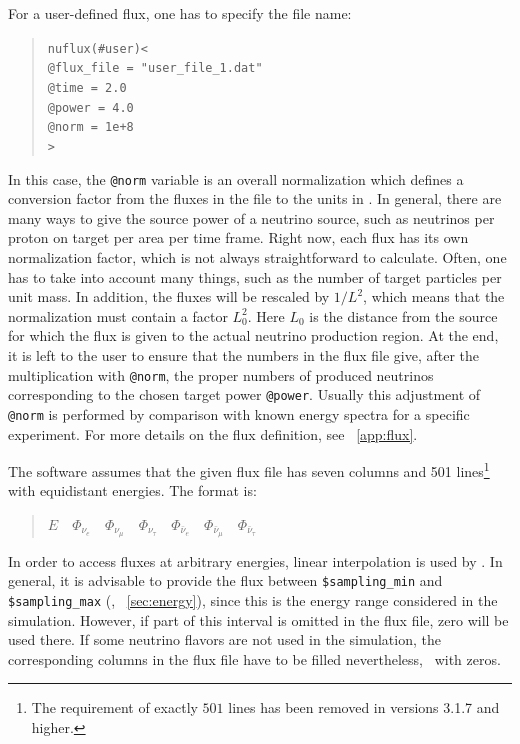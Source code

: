 %
For a user-defined flux, one has to specify the file name:
\begin{quote}
{\tt nuflux(\#user)<}\\
{\tt \tb @flux\_file = "user\_file\_1.dat"\\
\tb @time = 2.0\\
\tb @power = 4.0\\
\tb @norm = 1e+8}\\
{\tt >}
\end{quote}
In this case, the {\tt @norm} variable is an overall normalization which defines a conversion factor from the fluxes in the file to the units in \GLOBES . In general, there are many ways to give the source power of a 
neutrino source, such as neutrinos per proton on target per area per time frame. Right now, each flux has its own normalization factor, which is
not always straightforward to calculate. Often, one has to take into account
many things, such as the number of target particles per unit mass. 
In addition, the fluxes will be rescaled by $1/L^2$, which means that the
normalization must contain a factor $L_0^2$. Here $L_0$ is the distance from the source for which the flux is given to the actual neutrino production region. At the end, it is left to the user to ensure that the 
numbers in the flux file give, after the multiplication with {\tt @norm}, 
the proper numbers of produced neutrinos corresponding to the chosen target power {\tt @power}. Usually this adjustment of {\tt @norm} is performed by comparison with known energy spectra for a specific experiment.
For more details on the flux definition, see \App~\ref{app:flux}.

The software assumes that the given flux file has seven columns and
501 lines\footnote{The requirement of exactly $501$ lines 
has been removed in versions 3.1.7 and higher.} with equidistant energies. The format is:
\begin{quotation}
$ E\quad
\Phi_{\nu_e}\quad
\Phi_{\nu_\mu}\quad
\Phi_{\nu_\tau}\quad
\Phi_{\bar\nu_e}\quad
\Phi_{\bar\nu_\mu}\quad
\Phi_{\bar\nu_\tau}$
\end{quotation}
In order to access fluxes at arbitrary energies, linear interpolation 
is used by \GLOBES. In general, it is advisable to provide the flux
between {\tt \$sampling\_min} and {\tt \$sampling\_max} (\cf, \Sec~\ref{sec:energy}),
since this is the energy range considered in the simulation. However,
if part of this interval is omitted in the flux file, zero will be
used there. If some neutrino flavors are not used in the simulation,
the corresponding columns in the flux file have to be filled nevertheless,
\eg\ with zeros. 

